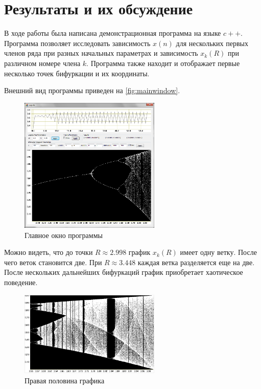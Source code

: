 \documentclass[12pt,a4paper]{article}
\begin{document}
\section{Результаты и их обсуждение}

В ходе работы была написана демонстрационная программа на языке $c++$. Программа позволяет исследовать зависимость $x(n)$ для нескольких первых членов ряда при разных начальных параметрах и зависимость $x_k(R)$ при различном номере члена $k$. Программа также находит и отображает первые несколько точек бифуркации и их координаты.

Внешний вид программы приведен на \autoref{fig:mainwindow}.

\begin{figure}[h]%
\centering
\includegraphics[width=0.6\textwidth]{mainwindow}%
\caption[Главное окно программы.]{Главное окно программы}%
\label{fig:mainwindow}%
\end{figure}

Можно видеть, что до точки $R \approx 2.998$ график $x_k(R)$ имеет одну ветку. После чего веток становится две. При $R \approx 3.448$ каждая ветка разделяется еще на две. После нескольких дальнейших бифуркаций график приобретает хаотическое поведение.

\begin{figure}[h]%
\centering
\includegraphics[width=0.6\textwidth]{right_area}%
\caption[Правая половина графика.]{Правая половина графика}%
\label{fig:right_area}%
\end{figure}
\end{document}

